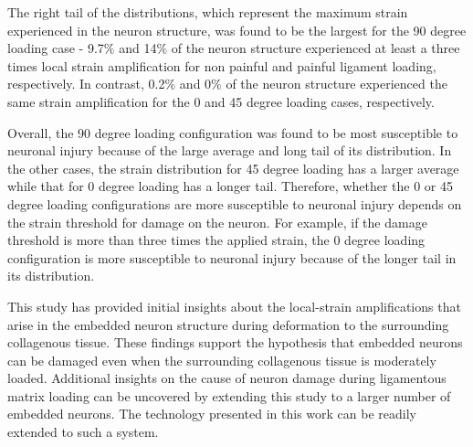 \documentclass[]{interact}
\newcommand{\red}[1]{\textcolor{red}{[#1]}}
\begin{document}
The right tail of the distributions, which represent the maximum strain experienced in the neuron structure, was found to be the largest for the 90 degree loading case - 9.7$\%$ and 14$\%$ of the neuron structure experienced at least a three times local strain amplification for non painful and painful ligament loading, respectively. In contrast, 0.2$\%$ and 0$\%$ of the neuron structure experienced the same strain amplification for the 0 and 45 degree loading cases, respectively.

Overall, the 90 degree loading configuration was found to be most susceptible to neuronal injury because of the large average and long tail of its distribution. In the other cases, the strain distribution for 45 degree loading has a larger average while that for 0 degree loading has a longer tail. Therefore, whether the 0 or 45 degree loading configurations are more susceptible to neuronal injury depends on the strain threshold for damage on the neuron. For example, if the damage threshold is more than three times the applied strain, the 0 degree loading configuration is more susceptible to neuronal injury because of the longer tail in its distribution.

This study has provided initial insights about the local-strain amplifications that arise in the embedded neuron structure during deformation to the surrounding collagenous tissue. These findings support the hypothesis that embedded neurons can be damaged even when the surrounding collagenous tissue is moderately loaded. Additional insights on the cause of neuron damage during ligamentous matrix loading can be uncovered by extending this study to a larger number of embedded neurons. The technology presented in this work can be readily extended to such a system.


%
\newpage

\end{document}
